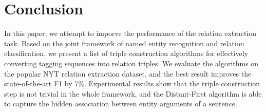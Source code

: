 \section{Conclusion}

In this paper, we attempt to imporve the performance of the relation extraction task.
Based on the joint framework of named entity recognition and relation classification,
we present a list of triple construction algorithms for effectively 
converting tagging sequences into relation triples.
We evaluate the algorithms on the popular NYT relation extraction dataset,
and the best result improves the state-of-the-art F1 by 7\%.
Experimental results show that the triple construction step is not trivial in the whole framework,
and the Distant-First algorithm is able to capture the hidden association between entity arguments of a sentence.


